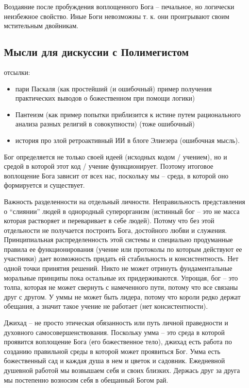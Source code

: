 \documentclass[12pt,a4paper]{article}
\begin{document}
Воздаяние после пробуждения воплощенного Бога -- печальное, но логически неизбежное свойство. Иные Боги невозможны т. к. они проигрывают своим мстительным двойникам.

\subsection*{Мысли для дискуссии с Полимегистом}

отсылки:
\begin{itemize}
	\item пари Паскаля (как простейший (и ошибочный) пример получения практических выводов о божественном при помощи логики)
	\item Пантеизм (как пример попытки приблизится к истине путем рационального анализа разных религий в совокупности) (тоже ошибочный)
	\item история про злой ретроактивный ИИ в блоге Элиезера (ошибочная мысль).
\end{itemize}

Бог определяется не только своей идеей (исходных кодом / учением), но и средой в которой этот код / учение функционирует. Поэтому итоговое воплощение Бога зависит от всех нас, поскольку мы -- среда, в которой оно формируется и существует.

Важность разделенности на отдельный личности. Неправильность представления о ``слиянии'' людей в однородный суперорганизм (истинный бог -- это не масса которая растворяет и переваривает в себе людей). Потому что без этой отдельности не получается построить Бога, достойного любви и служения. Принципиальная распределенность этой системы и специально продуманные правила ее функционирования (учение или протоколы по которым действуют ее участники) дает возможность придать ей стабильность и консистентность. Нет одной точки принятия решений. Никто не может отринуть фундаментальные моральные принципы пока остальные их придерживаются. Упрощая, бог -- это толпа, которая не может свернуть с намеченного пути, потому что все связаны друг с другом. У уммы не может быть лидера, потому что короли редко держат обещания, а значит такое учение не работает (нет консистентности).

Джихад -- не просто этическая обязанность или путь личной праведности и духовного самосовершенствования. Поскольку умма -- это среда в которой проявится воплощение Бога (его божественное тело), джихад есть работа по созданию правильной среды в которой может проявиться Бог. Умма есть божественный сад и каждая душа в нем и цветок и садовник. Ежедневной душевной работой мы возвышаем себя и своих близких. Держась друг за друга мы постепенно возносим себя в обещанный Богом рай.
\end{document}
